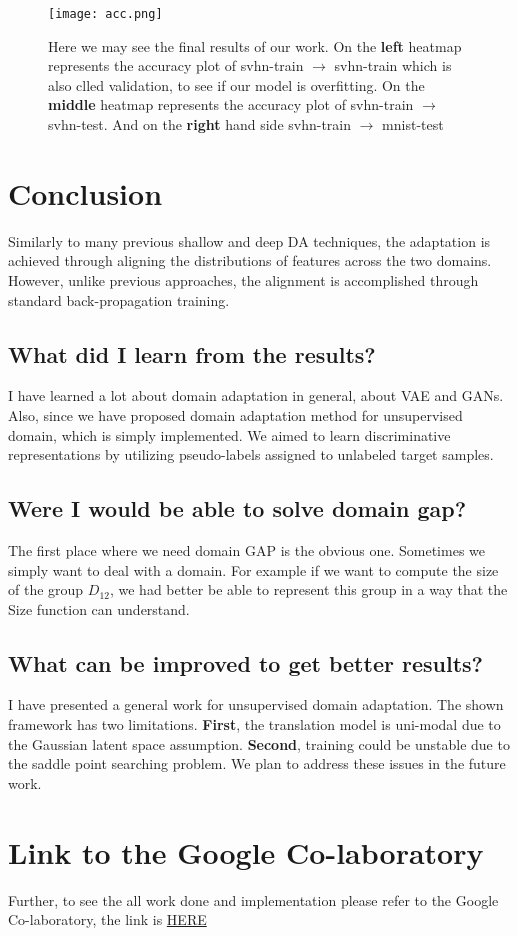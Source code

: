\documentclass{article}
\begin{document}
\begin{figure}[h!]
\centering
\texttt{[image: acc.png]}
\caption{Here we may see the final results of our work. On the \textbf{left} heatmap represents the accuracy plot of svhn-train $\rightarrow$ svhn-train which is also clled validation, to see if our model is overfitting. On the \textbf{middle} heatmap represents the accuracy plot of svhn-train $\rightarrow$ svhn-test. And on the \textbf{right} hand side svhn-train $\rightarrow$ mnist-test   }
\label{fig:acc}
\end{figure}


\section{Conclusion}
Similarly to many
previous shallow and deep DA techniques, the adaptation is achieved through aligning the
distributions of features across the two domains. However, unlike previous approaches, the
alignment is accomplished through standard back-propagation training.
\subsection{What did I learn from the results?}
I have learned a lot about domain adaptation in general, about VAE and GANs. 
Also, since we have proposed domain adaptation method for unsupervised domain,
which is simply implemented. We aimed to learn discriminative representations by utilizing pseudo-labels assigned to unlabeled target samples. 
\subsection{Were I would be able to solve domain gap? }
The first place where we need domain GAP is the obvious one. Sometimes we simply want to deal with a domain. For example if we want to compute the size of the group $D_12$, we had better be able to represent this group in a way that the Size function can understand.
\subsection{What can be improved to get better results?}
I have presented a general work for unsupervised domain adaptation. The shown framework has two limitations. \textbf{First}, the translation
model is uni-modal due to the Gaussian latent space assumption. \textbf{Second}, training could be unstable
due to the saddle point searching problem. We plan to address these issues in the future work.

\section{Link to the Google Co-laboratory}
Further, to see the all work done and implementation please refer to the Google Co-laboratory, the link is \href{https://colab.research.google.com/drive/1hHlQvUjr4gjxPlGRlX0VyqmN7rcThc1E}{HERE} 



\end{document}
